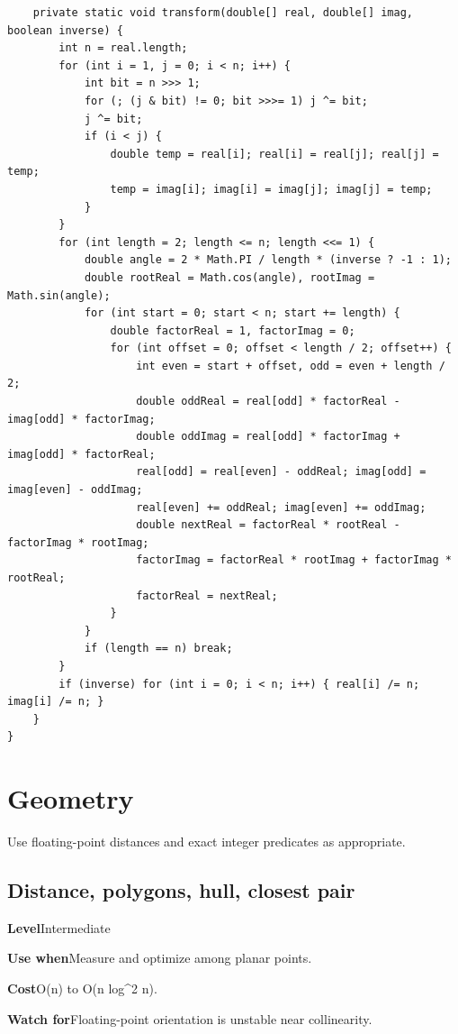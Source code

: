 \documentclass[10pt,letterpaper]{article}
\newcommand{\entrylabel}[1]{\textcolor{accent}{\bfseries #1}}
\begin{document}
\begin{lstlisting}
    private static void transform(double[] real, double[] imag, boolean inverse) {
        int n = real.length;
        for (int i = 1, j = 0; i < n; i++) {
            int bit = n >>> 1;
            for (; (j & bit) != 0; bit >>>= 1) j ^= bit;
            j ^= bit;
            if (i < j) {
                double temp = real[i]; real[i] = real[j]; real[j] = temp;
                temp = imag[i]; imag[i] = imag[j]; imag[j] = temp;
            }
        }
        for (int length = 2; length <= n; length <<= 1) {
            double angle = 2 * Math.PI / length * (inverse ? -1 : 1);
            double rootReal = Math.cos(angle), rootImag = Math.sin(angle);
            for (int start = 0; start < n; start += length) {
                double factorReal = 1, factorImag = 0;
                for (int offset = 0; offset < length / 2; offset++) {
                    int even = start + offset, odd = even + length / 2;
                    double oddReal = real[odd] * factorReal - imag[odd] * factorImag;
                    double oddImag = real[odd] * factorImag + imag[odd] * factorReal;
                    real[odd] = real[even] - oddReal; imag[odd] = imag[even] - oddImag;
                    real[even] += oddReal; imag[even] += oddImag;
                    double nextReal = factorReal * rootReal - factorImag * rootImag;
                    factorImag = factorReal * rootImag + factorImag * rootReal;
                    factorReal = nextReal;
                }
            }
            if (length == n) break;
        }
        if (inverse) for (int i = 0; i < n; i++) { real[i] /= n; imag[i] /= n; }
    }
}
\end{lstlisting}
\section{Geometry}
\begin{guidebox}Use floating-point distances and exact integer predicates as appropriate.\end{guidebox}
\subsection{Distance, polygons, hull, closest pair}
\begin{guidebox}\small
\entrylabel{Level}\quad Intermediate\par
\entrylabel{Use when}\quad Measure and optimize among planar points.\par
\entrylabel{Cost}\quad O(n) to O(n log\textasciicircum{}2 n).\par
\entrylabel{Watch for}\quad Floating-point orientation is unstable near collinearity.\par
\end{guidebox}
\end{document}
